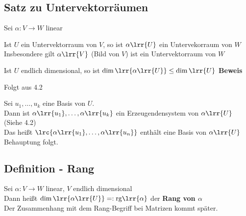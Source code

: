 \subsection{Satz zu Untervektorräumen}
	Sei $\alpha:V\rightarrow W$ linear
		\item Ist $U$ ein Untervektorraum von $V$, so ist $\alpha\lrr{U}$ ein Untervekorraum von $W$\\
			Insbesondere gilt $\alpha\lrr{V}$ (Bild von $V$) ist ein Untervektorraum von $W$
		\item Ist $U$ endlich dimensional, so ist $\dim\lrr{\alpha\lrr{U}}\leq\dim\lrr{U}$
	\subExEnd
	\textbf{Beweis}
		\item Folgt aus 4.2
		\item Sei $u_1,\dots,u_k$ eine Basis von $U$.\\
			Dann ist $\alpha\lrr{u_1},\dots,\alpha\lrr{u_k}$ ein Erzeugendensystem von $\alpha\lrr{U}$ (Siehe 4.2)\\
			Das heißt $\lrc{\alpha\lrr{u_1},\dots,\alpha\lrr{u_n}}$ enthält eine Basis von $\alpha\lrr{U}$ Behauptung folgt.
	\subExEnd
	
\subsection{Definition - Rang}
	Sei $\alpha:V\rightarrow W$ linear, $V$ endlich dimensional\\
	Dann heißt $\dim\lrr{\alpha\lrr{U}}=:\mbox{rg}\lrr{\alpha}$ der \textbf{Rang von $\alpha$}\\
	Der Zusammenhang mit dem Rang-Begriff bei Matrizen kommt später.
	

